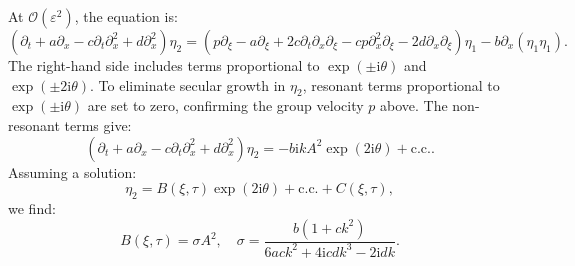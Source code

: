 \documentclass[alpha-refs, 12pt]{wiley-article}
\renewcommand{\O}{\mathcal{O}}
\newcommand{\ui}{\mathrm{i}}
\newcommand{\eps}{\varepsilon}
\begin{document}
At $\O(\eps^2)$, the equation is:
\begin{equation}\label{eq:second_order_b}
  \left( \partial_t + a \partial_x - c \partial_t \partial_x^2 + d \partial_x^2 \right) \eta_2 = \left( p \partial_\xi - a \partial_\xi + 2 c \partial_t \partial_x \partial_\xi - c p \partial_x^2 \partial_\xi - 2 d \partial_x \partial_\xi \right) \eta_1 - b \partial_x (\eta_1 \eta_1).
\end{equation}
The right-hand side includes terms proportional to $\exp(\pm \ui \theta)$ and $\exp(\pm 2 \ui \theta)$. To eliminate secular growth in $\eta_2$, resonant terms proportional to $\exp(\pm \ui \theta)$ are set to zero, confirming the group velocity $p$ above. The non-resonant terms give:
\begin{equation}\label{eq:second_order_nonresonant}
  \left( \partial_t + a \partial_x - c \partial_t \partial_x^2 + d \partial_x^2 \right) \eta_2 = - b \ui k A^2 \exp(2 \ui \theta) + \text{c.c.}.
\end{equation}
Assuming a solution:
\begin{equation}\label{eq:eta2_solution}
  \eta_2 = B(\xi, \tau) \exp(2 \ui \theta) + \text{c.c.} + C(\xi, \tau),
\end{equation}
we find:
\begin{equation}\label{eq:B_solution}
  B(\xi, \tau) = \sigma A^2, \quad \sigma = \frac{b (1 + c k^2)}{6 a c k^2 + 4 \ui c d k^3 - 2 \ui d k}.
\end{equation}
\end{document}
